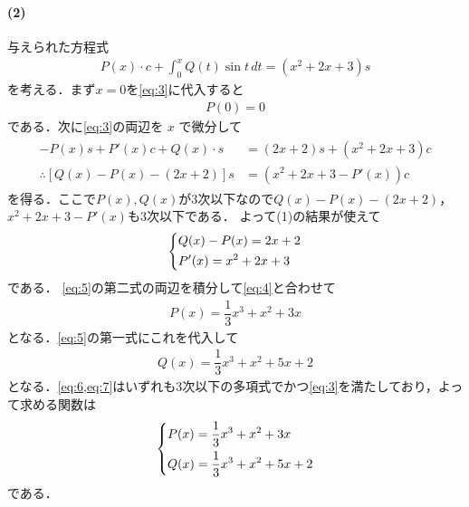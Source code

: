 \documentclass[../../main.tex]{subfiles}
\begin{document}
\paragraph{(2)}
与えられた方程式
\begin{align}
  P(x)\cdot c+\int_0^xQ(t)\sin t\,dt=(x^2+2x+3)s \label{eq:3}
\end{align}
を考える．まず$x=0$を\cref{eq:3}に代入すると
\begin{align}
  P(0) = 0 \label{eq:4}
\end{align}
である．次に\cref{eq:3}の両辺を $x$ で微分して
\begin{align}
  \begin{split}
    -P(x)s+P'(x)c+Q(x)\cdot s&=(2x+2)s+(x^2+2x+3)c \\
    \therefore
    [Q(x)-P(x)-(2x+2)]s&=(x^2+2x+3-P'(x))c
  \end{split}
\end{align}
を得る．ここで$P(x), Q(x)$が$3$次以下なので$Q(x)-P(x)-(2x+2)$，$x^2+2x+3-P'(x)$も$3$次以下である．
よって(1)の結果が使えて
\begin{align}
  \begin{dcases}\displaystyle
    Q(x)-P(x)=2x+2 \\
    P'(x)=x^2+2x+3
  \end{dcases} \label{eq:5}
\end{align}
である．
\cref{eq:5}の第二式の両辺を積分して\cref{eq:4}と合わせて
\begin{align}
  P(x)=\dfrac{1}{3}x^3+x^2+3x  \label{eq:6}
\end{align}
となる．\cref{eq:5}の第一式にこれを代入して
\begin{align}
  Q(x)=\dfrac{1}{3}x^3+x^2+5x+2 \label{eq:7}
\end{align}
となる．\cref{eq:6,eq:7}はいずれも$3$次以下の多項式でかつ\cref{eq:3}を満たしており，よって求める関数は
\begin{align}
  \begin{dcases}
    P(x)=\dfrac{1}{3}x^3+x^2+3x \\
    Q(x)=\dfrac{1}{3}x^3+x^2+5x+2
  \end{dcases}
\end{align}
である．

\newpage
\end{document}
